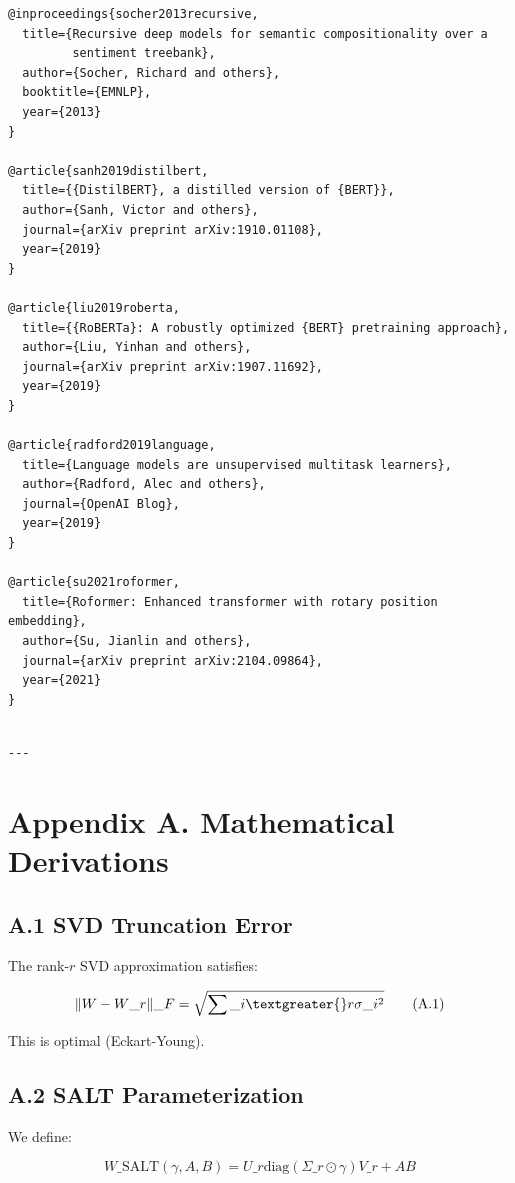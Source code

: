 \begin{lstlisting}
@inproceedings{socher2013recursive,
  title={Recursive deep models for semantic compositionality over a 
         sentiment treebank},
  author={Socher, Richard and others},
  booktitle={EMNLP},
  year={2013}
}

@article{sanh2019distilbert,
  title={{DistilBERT}, a distilled version of {BERT}},
  author={Sanh, Victor and others},
  journal={arXiv preprint arXiv:1910.01108},
  year={2019}
}

@article{liu2019roberta,
  title={{RoBERTa}: A robustly optimized {BERT} pretraining approach},
  author={Liu, Yinhan and others},
  journal={arXiv preprint arXiv:1907.11692},
  year={2019}
}

@article{radford2019language,
  title={Language models are unsupervised multitask learners},
  author={Radford, Alec and others},
  journal={OpenAI Blog},
  year={2019}
}

@article{su2021roformer,
  title={Roformer: Enhanced transformer with rotary position embedding},
  author={Su, Jianlin and others},
  journal={arXiv preprint arXiv:2104.09864},
  year={2021}
}
\end{lstlisting}
\begin{lstlisting}

---
\end{lstlisting}


\section{Appendix A. Mathematical Derivations}

\subsection{A.1 SVD Truncation Error}

The rank-$r$ SVD approximation satisfies:

\[
\|W - W\_r\|\_F = \sqrt{\sum\_{i \textgreater{} r} \sigma\_i^2}
\tag{A.1}
\]

This is optimal (Eckart-Young).

\subsection{A.2 SALT Parameterization}

We define:

\[
W\_\text{SALT}(\gamma, A, B) = U\_r \text{diag}(\Sigma\_r \odot \gamma) V\_r + AB
\tag{A.2}
\]

